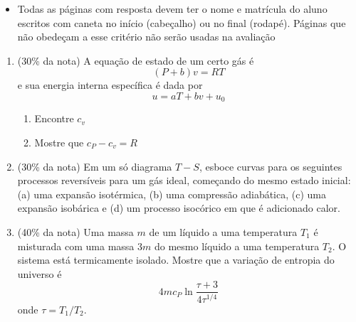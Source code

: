 \documentclass[12pt,a4paper,brazilian]{article}
\newcommand{\ratio}[1]{(#1\% da nota)}
\def\Description{Termodinâmica -- Prova 1}
\begin{document}
\begin{tcolorbox}[colback=black!10, colframe=black!50, title=Observações]
    \begin{itemize}
        \item Todas as páginas com resposta devem ter o nome e matrícula do
            aluno escritos com caneta no início (cabeçalho) ou no final
            (rodapé). Páginas que não obedeçam a esse critério não serão usadas
            na avaliação
    \end{itemize}
\end{tcolorbox}

\vspace{2em}

\begin{enumerate}
    \item\ratio{30} A equação de estado de um certo gás é 
        \[
            (P+b)v = RT
        \]
        e sua energia interna específica é dada por 
        \[
            u=aT+bv+u_0
        \]
        \begin{enumerate}
            \item Encontre \(c_v\)
            \item Mostre que \(c_P -c_v = R\)
        \end{enumerate}
    \item\ratio{30} Em um só diagrama \(T-S\), esboce curvas para os seguintes processos
        reversíveis para um gás ideal, começando do mesmo estado inicial: (a)
        uma expansão isotérmica, (b) uma compressão adiabática, (c) uma expansão
        isobárica e (d) um processo isocórico em que é adicionado calor.

    \item\ratio{40} Uma massa \(m\) de um líquido a uma temperatura \(T_1\) é misturada
        com uma massa \(3m\) do mesmo líquido a uma temperatura \(T_2\).
        O sistema está termicamente isolado. Mostre que a variação de entropia do
        universo é
        \[
            4 m c_P \ln\frac{\tau+3}{4\tau^{1/4}}
        \]
        onde \(\tau=T_1/T_2\).


\end{enumerate}

\newpage
\def\Description{Termodinâmica -- Gabarito}
\end{document}
